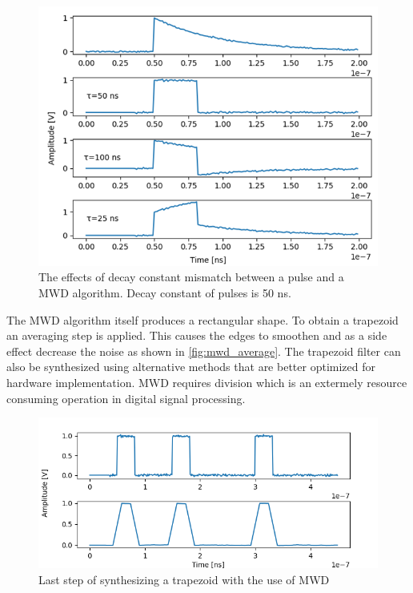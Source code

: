 \begin{figure}[H]
  \centering
  \includegraphics[width=\linewidth]{media/mwd_tau.png}
  \caption{The effects of decay constant mismatch between a pulse and a MWD algorithm. Decay constant of pulses is 50 ns.}
  \label{fig:mwd_tau} 
\end{figure}

The MWD algorithm itself produces a rectangular shape. To obtain a trapezoid
an averaging step is applied. This causes the edges to smoothen and as a 
side effect decrease the noise as shown in \autoref{fig:mwd_average}.
The trapezoid filter can also be synthesized using
alternative methods that are better optimized for hardware implementation.
MWD requires division which is an extermely resource consuming operation 
in digital signal processing.

\begin{figure}[H]
  \centering
  \includegraphics[width=\linewidth]{media/mwd_average.png}
  \caption{Last step of synthesizing a trapezoid with the use of MWD}
  \label{fig:mwd_average} 
\end{figure}

